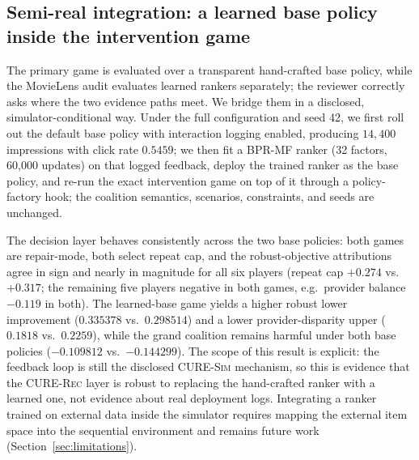 \documentclass[pdflatex,sn-mathphys-num]{sn-jnl}
\theoremstyle{thmstyleone}
\theoremstyle{thmstyletwo}
\theoremstyle{thmstylethree}
\newcommand{\CURE}{\textsc{CURE-Rec}}
\newcommand{\Sim}{\textsc{CURE-Sim}}
\begin{document}
\subsection{Semi-real integration: a learned base policy inside the intervention game}\label{sec:semireal}

The primary game is evaluated over a transparent hand-crafted base policy, while the MovieLens audit evaluates learned rankers separately; the reviewer correctly asks where the two evidence paths meet. We bridge them in a disclosed, simulator-conditional way. Under the full configuration and seed 42, we first roll out the default base policy with interaction logging enabled, producing $14{,}400$ impressions with click rate $0.5459$; we then fit a BPR-MF ranker (32 factors, 60{,}000 updates) on that logged feedback, deploy the trained ranker as the base policy, and re-run the exact intervention game on top of it through a policy-factory hook; the coalition semantics, scenarios, constraints, and seeds are unchanged.

\begin{table}[t]
\caption{Semi-real integration (seed 42, full configuration): the exact intervention game evaluated over the hand-crafted base policy versus a BPR-MF ranker trained on simulator-logged feedback. Both decisions operate in repair mode; lower/upper improvements are in CURE-Sim normalized utility units.}\label{tab:semireal}
\centering
\scriptsize
\setlength{\tabcolsep}{3pt}
\end{table}

The decision layer behaves consistently across the two base policies: both games are repair-mode, both select repeat cap, and the robust-objective attributions agree in sign and nearly in magnitude for all six players (repeat cap $+0.274$ vs.\ $+0.317$; the remaining five players negative in both games, e.g.\ provider balance $-0.119$ in both). The learned-base game yields a higher robust lower improvement ($0.335378$ vs.\ $0.298514$) and a lower provider-disparity upper ($0.1818$ vs.\ $0.2259$), while the grand coalition remains harmful under both base policies ($-0.109812$ vs.\ $-0.144299$). The scope of this result is explicit: the feedback loop is still the disclosed \Sim{} mechanism, so this is evidence that the \CURE{} layer is robust to replacing the hand-crafted ranker with a learned one, not evidence about real deployment logs. Integrating a ranker trained on external data inside the simulator requires mapping the external item space into the sequential environment and remains future work (Section~\ref{sec:limitations}).
\end{document}
